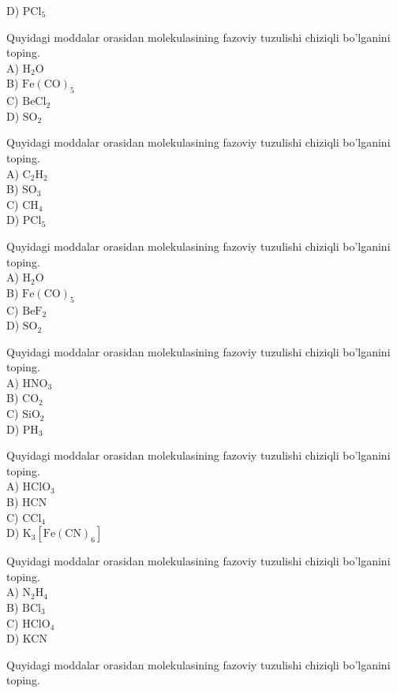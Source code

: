 D) $\mathrm{PCl}_{5}$
  \item Quyidagi moddalar orasidan molekulasining fazoviy tuzulishi chiziqli bo'lganini toping.\\
A) $\mathrm{H}_{2} \mathrm{O}$\\
B) $\mathrm{Fe}(\mathrm{CO})_{5}$\\
C) $\mathrm{BeCl}_{2}$\\
D) $\mathrm{SO}_{2}$
  \item Quyidagi moddalar orasidan molekulasining fazoviy tuzulishi chiziqli bo'lganini toping.\\
A) $\mathrm{C}_{2} \mathrm{H}_{2}$\\
B) $\mathrm{SO}_{3}$\\
C) $\mathrm{CH}_{4}$\\
D) $\mathrm{PCl}_{5}$
  \item Quyidagi moddalar orasidan molekulasining fazoviy tuzulishi chiziqli bo'lganini toping.\\
A) $\mathrm{H}_{2} \mathrm{O}$\\
B) $\mathrm{Fe}(\mathrm{CO})_{5}$\\
C) $\mathrm{BeF}_{2}$\\
D) $\mathrm{SO}_{2}$
  \item Quyidagi moddalar orasidan molekulasining fazoviy tuzulishi chiziqli bo'lganini toping.\\
A) $\mathrm{HNO}_{3}$\\
B) $\mathrm{CO}_{2}$\\
C) $\mathrm{SiO}_{2}$\\
D) $\mathrm{PH}_{3}$
  \item Quyidagi moddalar orasidan molekulasining fazoviy tuzulishi chiziqli bo'lganini toping.\\
A) $\mathrm{HClO}_{3}$\\
B) HCN\\
C) $\mathrm{CCl}_{4}$\\
D) $\mathrm{K}_{3}\left[\mathrm{Fe}(\mathrm{CN})_{6}\right]$
  \item Quyidagi moddalar orasidan molekulasining fazoviy tuzulishi chiziqli bo'lganini toping.\\
A) $\mathrm{N}_{2} \mathrm{H}_{4}$\\
B) $\mathrm{BCl}_{3}$\\
C) $\mathrm{HClO}_{4}$\\
D) KCN
  \item Quyidagi moddalar orasidan molekulasining fazoviy tuzulishi chiziqli bo'lganini toping.\\
